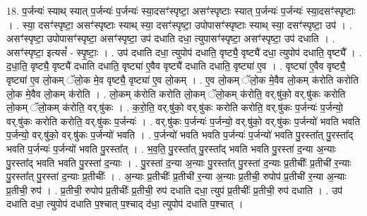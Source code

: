 \documentclass[17pt]{extarticle}
\begin{document}
18. प॒र्जन्यः॑ स्याथ् स्यात् प॒र्जन्यः॑ प॒र्जन्यः॑ स्या॒दसꣳ॑स्पृष्टा॒ असꣳ॑स्पृष्टाः स्यात् प॒र्जन्यः॑ प॒र्जन्यः॑ स्या॒दसꣳ॑स्पृष्टाः । . स्या॒ दसꣳ॑स्पृष्टा॒ असꣳ॑स्पृष्टाः स्याथ् स्या॒ दसꣳ॑स्पृष्टा॒ उपोपासꣳ॑स्पृष्टाः स्याथ् स्या॒ दसꣳ॑स्पृष्टा॒ उप॑ । . असꣳ॑स्पृष्टा॒ उपोपासꣳ॑स्पृष्टा॒ असꣳ॑स्पृष्टा॒ उप॑ दधाति दधा॒ त्युपासꣳ॑स्पृष्टा॒ असꣳ॑स्पृष्टा॒ उप॑ दधाति । . असꣳ॑स्पृष्टा॒ इत्यसं᳚ - स्पृ॒ष्टाः॒ । . उप॑ दधाति दधा॒ त्युपोप॑ दधाति॒ वृष्ट्यै॒ वृष्ट्यै॑ दधा॒ त्युपोप॑ दधाति॒ वृष्ट्यै᳚ । . द॒धा॒ति॒ वृष्ट्यै॒ वृष्ट्यै॑ दधाति दधाति॒ वृष्ट्या॑ ए॒वैव वृष्ट्यै॑ दधाति दधाति॒ वृष्ट्या॑ ए॒व । . वृष्ट्या॑ ए॒वैव वृष्ट्यै॒ वृष्ट्या॑ ए॒व लो॒कम् ॅलो॒क मे॒व वृष्ट्यै॒ वृष्ट्या॑ ए॒व लो॒कम् । . ए॒व लो॒कम् ॅलो॒क मे॒वैव लो॒कम् क॑रोति करोति लो॒क मे॒वैव लो॒कम् क॑रोति । . लो॒कम् क॑रोति करोति लो॒कम् ॅलो॒कम् क॑रोति॒ वर्.षु॑को॒ वर्.षु॑कः करोति लो॒कम् ॅलो॒कम् क॑रोति॒ वर्.षु॑कः । . क॒रो॒ति॒ वर्.षु॑को॒ वर्.षु॑कः करोति करोति॒ वर्.षु॑कः प॒र्जन्यः॑ प॒र्जन्यो॒ वर्.षु॑कः करोति करोति॒ वर्.षु॑कः प॒र्जन्यः॑ । . वर्.षु॑कः प॒र्जन्यः॑ प॒र्जन्यो॒ वर्.षु॑को॒ वर्.षु॑कः प॒र्जन्यो॑ भवति भवति प॒र्जन्यो॒ वर्.षु॑को॒ वर्.षु॑कः प॒र्जन्यो॑ भवति । . प॒र्जन्यो॑ भवति भवति प॒र्जन्यः॑ प॒र्जन्यो॑ भवति पु॒रस्ता᳚त् पु॒रस्ता᳚द् भवति प॒र्जन्यः॑ प॒र्जन्यो॑ भवति पु॒रस्ता᳚त् । . भ॒व॒ति॒ पु॒रस्ता᳚त् पु॒रस्ता᳚द् भवति भवति पु॒रस्ता॑ द॒न्या अ॒न्याः पु॒रस्ता᳚द् भवति भवति पु॒रस्ता॑ द॒न्याः । . पु॒रस्ता॑ द॒न्या अ॒न्याः पु॒रस्ता᳚त् पु॒रस्ता॑ द॒न्याः प्र॒तीचीः᳚ प्र॒तीची॑ र॒न्याः पु॒रस्ता᳚त् पु॒रस्ता॑ द॒न्याः प्र॒तीचीः᳚ । . अ॒न्याः प्र॒तीचीः᳚ प्र॒तीची॑ र॒न्या अ॒न्याः प्र॒तीची॒ रुपोप॑ प्र॒तीची॑ र॒न्या अ॒न्याः प्र॒तीची॒ रुप॑ । . प्र॒तीची॒ रुपोप॑ प्र॒तीचीः᳚ प्र॒तीची॒ रुप॑ दधाति दधा॒ त्युप॑ प्र॒तीचीः᳚ प्र॒तीची॒ रुप॑ दधाति । . उप॑ दधाति दधा॒ त्युपोप॑ दधाति प॒श्चात् प॒श्चाद् द॑धा॒ त्युपोप॑ दधाति प॒श्चात् । \newline
\end{document}
